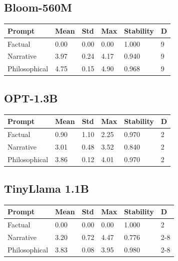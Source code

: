 \documentclass[12pt,a4paper]{article}
\begin{document}
\subsection{Bloom-560M}

\begin{table}[h]
\centering
\begin{tabular}{llllll}
\toprule
\textbf{Prompt} & \textbf{Mean} & \textbf{Std} & \textbf{Max} & \textbf{Stability} & \textbf{D} \\
\midrule
Factual & 0.00 & 0.00 & 0.00 & 1.000 & 9 \\
Narrative & 3.97 & 0.24 & 4.17 & 0.940 & 9 \\
Philosophical & 4.75 & 0.15 & 4.90 & 0.968 & 9 \\
\bottomrule
\end{tabular}
\end{table}

\subsection{OPT-1.3B}

\begin{table}[h]
\centering
\begin{tabular}{llllll}
\toprule
\textbf{Prompt} & \textbf{Mean} & \textbf{Std} & \textbf{Max} & \textbf{Stability} & \textbf{D} \\
\midrule
Factual & 0.90 & 1.10 & 2.25 & 0.970 & 2 \\
Narrative & 3.01 & 0.48 & 3.52 & 0.840 & 2 \\
Philosophical & 3.86 & 0.12 & 4.01 & 0.970 & 2 \\
\bottomrule
\end{tabular}
\end{table}

\subsection{TinyLlama 1.1B}

\begin{table}[h]
\centering
\begin{tabular}{llllll}
\toprule
\textbf{Prompt} & \textbf{Mean} & \textbf{Std} & \textbf{Max} & \textbf{Stability} & \textbf{D} \\
\midrule
Factual & 0.00 & 0.00 & 0.00 & 1.000 & 2 \\
Narrative & 3.20 & 0.72 & 4.47 & 0.776 & 2-8 \\
Philosophical & 3.83 & 0.08 & 3.95 & 0.980 & 2-8 \\
\bottomrule
\end{tabular}
\end{table}
\end{document}
